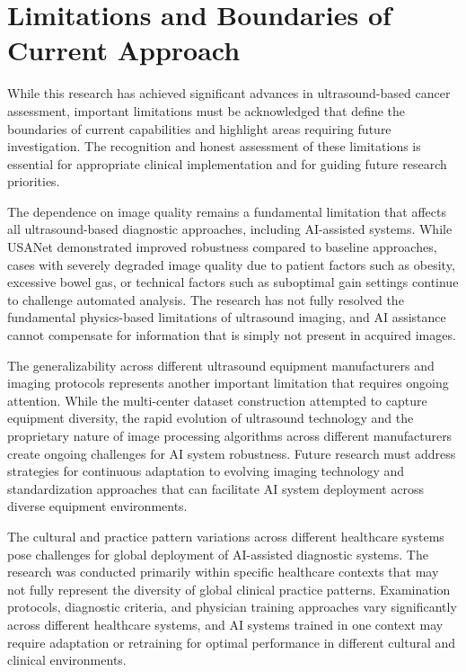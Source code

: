 \section{Limitations and Boundaries of Current Approach}

While this research has achieved significant advances in ultrasound-based cancer assessment, important limitations must be acknowledged that define the boundaries of current capabilities and highlight areas requiring future investigation. The recognition and honest assessment of these limitations is essential for appropriate clinical implementation and for guiding future research priorities.

The dependence on image quality remains a fundamental limitation that affects all ultrasound-based diagnostic approaches, including AI-assisted systems. While USANet demonstrated improved robustness compared to baseline approaches, cases with severely degraded image quality due to patient factors such as obesity, excessive bowel gas, or technical factors such as suboptimal gain settings continue to challenge automated analysis. The research has not fully resolved the fundamental physics-based limitations of ultrasound imaging, and AI assistance cannot compensate for information that is simply not present in acquired images.

The generalizability across different ultrasound equipment manufacturers and imaging protocols represents another important limitation that requires ongoing attention. While the multi-center dataset construction attempted to capture equipment diversity, the rapid evolution of ultrasound technology and the proprietary nature of image processing algorithms across different manufacturers create ongoing challenges for AI system robustness. Future research must address strategies for continuous adaptation to evolving imaging technology and standardization approaches that can facilitate AI system deployment across diverse equipment environments.

The cultural and practice pattern variations across different healthcare systems pose challenges for global deployment of AI-assisted diagnostic systems. The research was conducted primarily within specific healthcare contexts that may not fully represent the diversity of global clinical practice patterns. Examination protocols, diagnostic criteria, and physician training approaches vary significantly across different healthcare systems, and AI systems trained in one context may require adaptation or retraining for optimal performance in different cultural and clinical environments.

